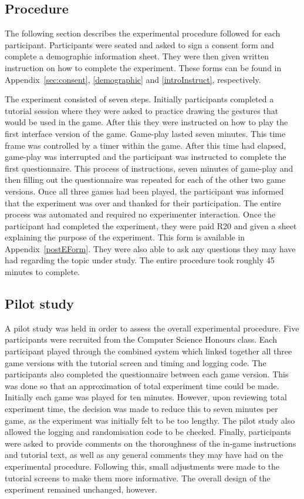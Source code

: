 \subsection{Procedure}
The following section describes the experimental procedure followed for each participant. Participants were seated and asked to sign a consent form and complete a demographic information sheet. They were then given written instruction on how to complete the experiment. These forms can be found in Appendix~\ref{sec:consent}, \ref{demographic} and \ref{introInstruct}, respectively.

The experiment consisted of seven steps. Initially participants completed a tutorial session where they were asked to practice drawing the gestures that would be used in the game. After this they were instructed on how to play the first interface version of the game. Game-play lasted seven minutes. This time frame was controlled by a timer within the game. After this time had elapsed, game-play was interrupted and the participant was instructed to complete the first questionnaire. This process of instructions, seven minutes of game-play and then filling out the questionnaire was repeated for each of the other two game versions. Once all three games had been played, the participant was informed that the experiment was over and thanked for their participation. The entire process was automated and required no experimenter interaction. Once the participant had completed the experiment, they were paid R20 and given a sheet explaining the purpose of the experiment. This form is available in Appendix~\ref{postEForm}. They were also able to ask any questions they may have had regarding the topic under study. The entire procedure took roughly 45 minutes to complete.

\subsection{Pilot study}
A pilot study was held in order to assess the overall experimental procedure. Five participants were recruited from the Computer Science Honours class. Each participant played through the combined system which linked together all three game versions with the tutorial screen and timing and logging code. The participants also completed the questionnaire between each game version. This was done so that an approximation of total experiment time could be made. Initially each game was played for ten minutes. However, upon reviewing total experiment time, the decision was made to reduce this to seven minutes per game, as the experiment was initially felt to be too lengthy. The pilot study also allowed the logging and randomisation code to be checked. Finally, participants were asked to provide comments on the thoroughness of the in-game instructions and tutorial text, as well as any general comments they may have had on the experimental procedure. Following this, small adjustments were made to the tutorial screens to make them more informative. The overall design of the experiment remained unchanged, however.
